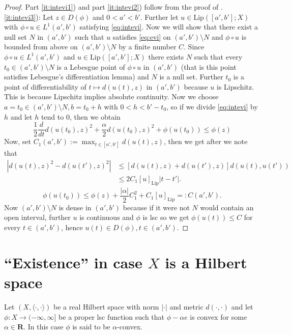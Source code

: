 \documentclass[a4paper,11pt, leqno]{scrreprt} %
\renewcommand{\leq}{\leqslant}
\renewcommand{\leq}{\leqslant}
\newcommand{\R}{\mathbf R}
\theoremstyle{change}
\theoremstyle{nonumberplain}
\newtheorem{proof}{Proof}
\begin{document}
\begin{proof}
Part \ref{it:intevi1}) and part \ref{it:intevi2}) follow from the
proof of . \ref{it:intevi3}): Let $z \in D(\phi)$ and
$0 < a' < b'$. Further let $u \in \text{Lip}([a', b']; X)$ with $\phi
\circ u \in L^1(a', b')$ satisfying \eqref{eq:intevi}. Now we will
show that there exist a null set $N$ in $(a', b')$ such that $u$
satisfies \ref{eq:evi} on $(a', b') \setminus N$ and $\phi \circ u$
is bounded from above on $(a', b') \setminus N$ by a finite number
$C$. Since $\phi \circ u \in L^1(a',b')$ and $u \in \text{Lip}([a',
b']; X)$ there exists $N$ such that every $t_0 \in (a', b') \setminus
N$ is a Lebesgue point of $\phi \circ u$ in $(a', b')$ (that is this
point satisfies Lebesgue's differentiation lemma) and $N$ is a null
set. Further $t_0$ is a point of differentiability of $t \mapsto
d(u(t), z)$ in $(a', b')$ because $u$ is Lipschitz. This is because
Lipschitz implies absolute continuity. Now we choose $a = t_0 \in (a',
b') \setminus N, b = t_0 + h$ with $0 < h < b' - t_0$, so if we divide
\eqref{eq:intevi} by $h$ and let $h$ tend to $0$, then we obtain
\begin{equation*}
\frac12 \frac{d}{dt} d(u(t_0), z)^2 + \frac\alpha2 d(u(t_0), z)^2 +
\phi(u(t_0)) \leq \phi(z)
\end{equation*}
Now, set $C_1(a', b') := \max_{t \in [a', b']} d(u(t), z)$, then we
get after we note that
\begin{equation*}
\begin{split}
  |d(u(t), z)^2 - d(u(t'), z)^2| &\leq [d(u(t), z) + d(u(t'),
  z)]d(u(t), u(t'))\\
  &\leq 2 C_1 [u]_\text{Lip} |t - t'|.
\end{split}
\end{equation*}
\begin{equation*}
  \phi(u(t_0)) \leq \phi(z) + \frac{|\alpha|}2 C_1^2 + C_1
  [u]_\text{Lip} =: C(a', b').
\end{equation*}
Now $(a', b') \setminus N$ is dense in $(a', b')$ because if it were
not $N$ would contain an open interval, further $u$ is continuous and
$\phi$ is lsc so we get $\phi(u(t)) \leq C$ for every $t \in (a',
b')$, hence $u(t) \in D(\phi), t \in (a', b')$.
\end{proof}

\section{``Existence'' in case $X$ is a Hilbert space}
Let $(X, \langle \cdot, \cdot \rangle)$ be a real Hilbert space with
norm $| \cdot |$ and metric $d( \cdot, \cdot)$ and let $\phi:X \to
(-\infty, \infty]$ be a proper lsc function such that $\phi - \alpha
e$ is convex for some $\alpha \in \R$. In this case $\phi$ is said to
be $\alpha$-convex.
\end{document}
